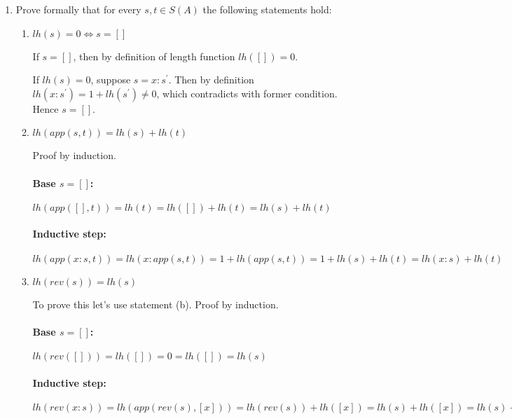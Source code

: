 \documentclass{article}
\begin{document}
\begin{enumerate}
\textbf{Finally, after applying $init$}
\begin{align*}
init(n : (e : (d : (u : (t : (s : [])))))) =\\ n : init(e : (d : (u : (t : (s : []))))) = ... =\\ n : (e : (d : (u : (t : init([s]))))) =\\ n : (e : (d : (u : (t : [])))) = [nedut]
\end{align*}

\item Prove formally that for every $s, t \in S(A)$ the following statements hold:

\begin{enumerate}
\item $lh(s) = 0 \iff s = []$

If $s = []$, then by definition of length function $lh([]) = 0$.

If $lh(s) = 0$, suppose $s = x : s ^ \prime$. Then by definition $lh(x : s ^ \prime) = 1 + lh(s ^ \prime) \neq 0$, which contradicts with former condition. Hence $s = []$.

\item $lh(app(s, t)) = lh(s) + lh(t)$

Proof by induction.

\paragraph{Base $s = []$:}
$lh(app([], t)) = lh(t) = lh([]) + lh(t) = lh(s) + lh(t)$

\paragraph{Inductive step:}
$lh(app(x : s, t)) = lh(x : app(s, t)) = 1 + lh(app(s, t)) = 1 + lh(s) + lh(t) = lh(x : s) + lh(t)$

\item $lh(rev(s)) = lh(s)$

To prove this let's use statement (b). Proof by induction.

\paragraph{Base $s = []$:}
$lh(rev([])) = lh([]) = 0 = lh([]) = lh(s)$

\paragraph{Inductive step:}
$lh(rev(x : s)) = lh(app(rev(s), [x])) = lh(rev(s)) + lh([x]) = lh(s) + lh([x]) = lh(s) + 1 + lh([]) = lh(s) + 1 = lh(x : s)$


\end{enumerate}
\end{enumerate}
\end{document}
